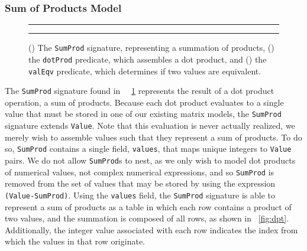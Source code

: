 \documentclass[sigconf]{acmart}
\begin{document}
\subsubsection{Sum of Products Model}
\label{sec:sumprod}

\begin{figure}
\begin{subfigure}[b]{0.5\textwidth}
  \centering
  
  \caption{}
  \label{alloy:sumprod}
\end{subfigure}
{\color{lightgray}\rule{0.4\textwidth}{0.1pt}}
\par\bigskip
\begin{subfigure}[b]{0.5\textwidth}
  \centering
  
  \caption{}
  \label{alloy:dotprod}
\end{subfigure}
{\color{lightgray}\rule{0.4\textwidth}{0.1pt}}
\par\bigskip
\begin{subfigure}[b]{0.5\textwidth}
  \centering
  
  \caption{}
  \label{alloy:valeqv}
\end{subfigure}
\caption{() The \texttt{SumProd} signature, representing a summation of products, () the \texttt{dotProd} predicate, which assembles a dot product, and () the \texttt{valEqv} predicate, which determines if two values are equivalent.}
\end{figure}

The \texttt{SumProd} signature found in ~\figurename~\ref{alloy:sumprod} represents the result of a dot product operation, a sum of products.  Because each dot product evaluates to a single value that must be stored in one of our existing matrix models, the \texttt{SumProd} signature extends \texttt{Value}.  Note that this evaluation is never actually realized, we merely wish to assemble values such that they represent a sum of products.  To do so, \texttt{SumProd} contains a single field, \texttt{values}, that maps unique integers to \texttt{Value} pairs.  We do not allow \texttt{SumProd}s to nest, as we only wish to model dot products of numerical values, not complex numerical expressions, and so \texttt{SumProd} is removed from the set of values that may be stored by using the expression \texttt{(Value-SumProd)}.  Using the \texttt{values} field, the \texttt{SumProd} signature is able to represent a sum of products as a table in which each row contains a product of two values, and the summation is composed of all rows, as shown in \figurename~\ref{fig:dpt}.  Additionally, the integer value associated with each row indicates the index from which the values in that row originate.
\end{document}
